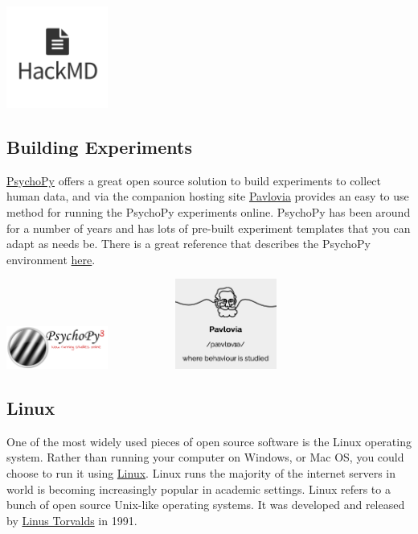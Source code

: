 \documentclass[
]{book}
\begin{document}
\href{https://opensource.com/article/19/7/enable-collaboration-hackmd}{\includegraphics[width=0.25\textwidth,height=\textheight]{images/hack_md.png}}

\hypertarget{building-experiments}{%
\subsection{Building Experiments}\label{building-experiments}}

\href{https://www.psychopy.org}{PsychoPy} offers a great open source solution to build experiments to collect human data, and via the companion hosting site \href{https://pavlovia.org}{Pavlovia} provides an easy to use method for running the PsychoPy experiments online. PsychoPy has been around for a number of years and has lots of pre-built experiment templates that you can adapt as needs be. There is a great reference that describes the PsychoPy environment \href{https://link.springer.com/article/10.3758/s13428-018-01193-y}{here}.

\href{https://www.psychopy.org}{\includegraphics[width=0.25\textwidth,height=\textheight]{images/psychopyLogoOnlineStrap_h480.png}}~~~~~~~~~~~~\href{https://pavlovia.org}{\includegraphics[width=0.25\textwidth,height=\textheight]{images/pavlovia.png}}

\hypertarget{linux}{%
\subsection{Linux}\label{linux}}

One of the most widely used pieces of open source software is the Linux operating system. Rather than running your computer on Windows, or Mac OS, you could choose to run it using \href{https://www.linux.org}{Linux}. Linux runs the majority of the internet servers in world is becoming increasingly popular in academic settings. Linux refers to a bunch of open source Unix-like operating systems. It was developed and released by \href{https://en.wikipedia.org/wiki/Linus_Torvalds}{Linus Torvalds} in 1991.
\end{document}
